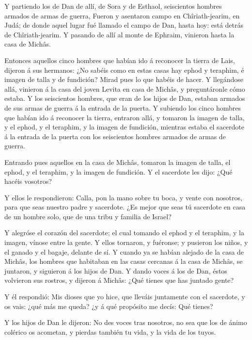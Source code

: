  Y partiendo los de Dan de allí, de Sora y de Esthaol,
seiscientos hombres armados de armas de guerra,  Fueron y
asentaron campo en Chîriath-jearim, en Judá; de donde aquel lugar fué
llamado el campo de Dan, hasta hoy: está detrás de Chîriath-jearim.
 Y pasando de allí al monte de Ephraim, vinieron hasta la
casa de Michâs.

 Entonces aquellos cinco hombres que habían ido á
reconocer la tierra de Lais, dijeron á sus hermanos: ¿No sabéis como en
estas casas hay ephod y teraphim, é imagen de talla y de fundición?
Mirad pues lo que habéis de hacer.  Y llegándose allá,
vinieron á la casa del joven Levita en casa de Michâs, y preguntáronle
cómo estaba.  Y los seiscientos hombres, que eran de los
hijos de Dan, estaban armados de sus armas de guerra á la entrada de la
puerta.  Y subiendo los cinco hombres que habían ido á
reconocer la tierra, entraron allá, y tomaron la imagen de talla, y el
ephod, y el teraphim, y la imagen de fundición, mientras estaba el
sacerdote á la entrada de la puerta con los seiscientos hombres armados
de armas de guerra.

 Entrando pues aquellos en la casa de Michâs, tomaron la
imagen de talla, el ephod, y el teraphim, y la imagen de fundición. Y el
sacerdote les dijo: ¿Qué hacéis vosotros?

 Y ellos le respondieron: Calla, pon la mano sobre tu
boca, y vente con nosotros, para que seas nuestro padre y sacerdote. ¿Es
mejor que seas tú sacerdote en casa de un hombre solo, que de una tribu
y familia de Israel?

 Y alegróse el corazón del sacerdote; el cual tomando el
ephod y el teraphim, y la imagen, vínose entre la gente. 
Y ellos tornaron, y fuéronse; y pusieron los niños, y el ganado y el
bagaje, delante de sí.  Y cuando ya se habían alejado de
la casa de Michâs, los hombres que habitaban en las casas cercanas á la
casa de Michâs, se juntaron, y siguieron á los hijos de Dan.
 Y dando voces á los de Dan, éstos volvieron sus rostros,
y dijeron á Michâs: ¿Qué tienes que has juntado gente?

 Y él respondió: Mis dioses que yo hice, que lleváis
juntamente con el sacerdote, y os vais: ¿qué más me queda? ¿y á qué
propósito me decís: Qué tienes?

 Y los hijos de Dan le dijeron: No des voces tras
nosotros, no sea que los de ánimo colérico os acometan, y pierdas
también tu vida, y la vida de los tuyos.

